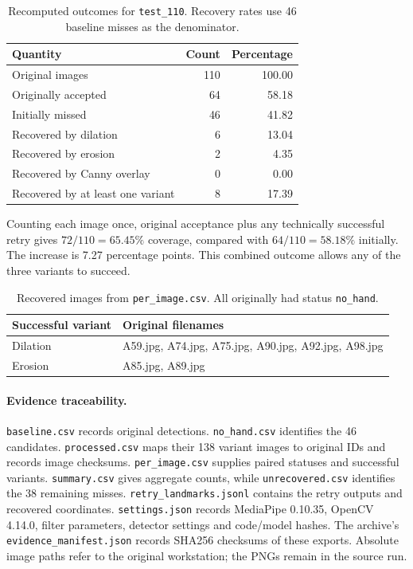 \begin{table}[ht]\centering
\caption{Recomputed outcomes for \texttt{test\_110}. Recovery rates use 46 baseline misses as the denominator.}
\begin{tabular}{lrr}\toprule
Quantity & Count & Percentage\\\midrule
Original images & 110 & 100.00\\
Originally accepted & 64 & 58.18\\
Initially missed & 46 & 41.82\\\midrule
Recovered by dilation & 6 & 13.04\\
Recovered by erosion & 2 & 4.35\\
Recovered by Canny overlay & 0 & 0.00\\
Recovered by at least one variant & 8 & 17.39\\\bottomrule
\end{tabular}
\end{table}

Counting each image once, original acceptance plus any technically successful retry gives \(72/110=65.45\%\) coverage, compared with \(64/110=58.18\%\) initially. The increase is 7.27 percentage points. This combined outcome allows any of the three variants to succeed.

\begin{table}[ht]\centering
\caption{Recovered images from \texttt{per\_image.csv}. All originally had status \texttt{no\_hand}.}
\begin{tabular}{ll}\toprule
Successful variant & Original filenames\\\midrule
Dilation & A59.jpg, A74.jpg, A75.jpg, A90.jpg, A92.jpg, A98.jpg\\
Erosion & A85.jpg, A89.jpg\\\bottomrule
\end{tabular}
\end{table}

\paragraph{Evidence traceability.}
\texttt{baseline.csv} records original detections. \texttt{no\_hand.csv} identifies the 46 candidates.
\texttt{processed.csv} maps their 138 variant images to original IDs and records image checksums.
\texttt{per\_image.csv} supplies paired statuses and successful variants.
\texttt{summary.csv} gives aggregate counts, while \texttt{unrecovered.csv} identifies the 38 remaining misses.
\texttt{retry\_landmarks.jsonl} contains the retry outputs and recovered coordinates.
\texttt{settings.json} records MediaPipe 0.10.35, OpenCV 4.14.0, filter parameters, detector settings and code/model hashes.
The archive's \texttt{evidence\_manifest.json} records SHA256 checksums of these exports.
Absolute image paths refer to the original workstation; the PNGs remain in the source run.


